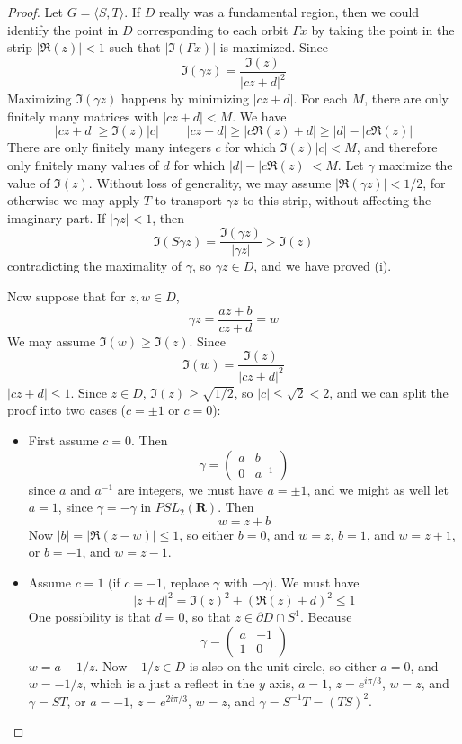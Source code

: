 \begin{proof}
    Let $G = \langle S,T \rangle$. If $D$ really was a fundamental region, then we could identify the point in $D$ corresponding to each orbit $\Gamma x$ by taking the point in the strip $|\Re(z)| < 1$ such that $|\Im(\Gamma x)|$ is maximized. Since
    \[ \Im(\gamma z) = \frac{\Im(z)}{|cz+d|^2} \]
    Maximizing $\Im(\gamma z)$ happens by minimizing $|cz + d|$. For each $M$, there are only finitely many matrices with $|cz + d| < M$. We have
    \[ |cz + d| \geq \Im(z) |c|\ \ \ \ \ \ \ \ \ \ |cz + d| \geq |c \Re(z) + d| \geq |d| - |c \Re(z)| \]
    There are only finitely many integers $c$ for which $\Im(z) |c| < M$, and therefore only finitely many values of $d$ for which $|d| - |c \Re(z)| < M$. Let $\gamma$ maximize the value of $\Im(z)$. Without loss of generality, we may assume $|\Re(\gamma z)| < 1/2$, for otherwise we may apply $T$ to transport $\gamma z$ to this strip, without affecting the imaginary part. If $|\gamma z| < 1$, then
    \[ \Im(S \gamma z) = \frac{\Im(\gamma z)}{|\gamma z|} > \Im(z) \]
    contradicting the maximality of $\gamma$, so $\gamma z \in D$, and we have proved (i).

    Now suppose that for $z,w \in D$,
    \[ \gamma z = \frac{az + b}{cz + d} = w \]
    We may assume $\Im(w) \geq \Im(z)$. Since
    \[ \Im(w) = \frac{\Im(z)}{|cz + d|^2} \]
    $|cz + d| \leq 1$. Since $z \in D$, $\Im(z) \geq \sqrt{1/2}$, so $|c| \leq \sqrt{2} < 2$, and we can split the proof into two cases ($c = \pm 1$ or $c = 0$):

    \begin{itemize}
        \item First assume $c = 0$. Then
        \[ \gamma = \begin{pmatrix} a & b \\ 0 & a^{-1} \end{pmatrix} \]
        since $a$ and $a^{-1}$ are integers, we must have $a = \pm 1$, and we might as well let $a = 1$, since $\gamma = - \gamma$ in $PSL_2(\mathbf{R})$. Then
        \[ w = z + b \]
        Now $|b| = |\Re(z-w)| \leq 1$, so either $b = 0$, and $w = z$, $b = 1$, and $w = z + 1$, or $b = -1$, and $w = z - 1$.

        \item Assume $c = 1$ (if $c = -1$, replace $\gamma$ with $-\gamma$). We must have
        \[ |z + d|^2 = \Im(z)^2 + (\Re(z) + d)^2 \leq 1 \]
        One possibility is that $d = 0$, so that $z \in \partial D \cap S^1$. Because
        \[ \gamma = \begin{pmatrix} a & -1 \\ 1 & 0 \end{pmatrix} \]
        $w = a - 1/z$. Now $-1/z \in D$ is also on the unit circle, so either $a = 0$, and $w = -1/z$, which is a just a reflect in the $y$ axis, $a = 1$, $z = e^{i\pi/3}$, $w = z$, and $\gamma = ST$, or $a = -1$, $z = e^{2i\pi/3}$, $w = z$, and $\gamma = S^{-1}T = (TS)^2$.


\end{itemize}
\end{proof}
